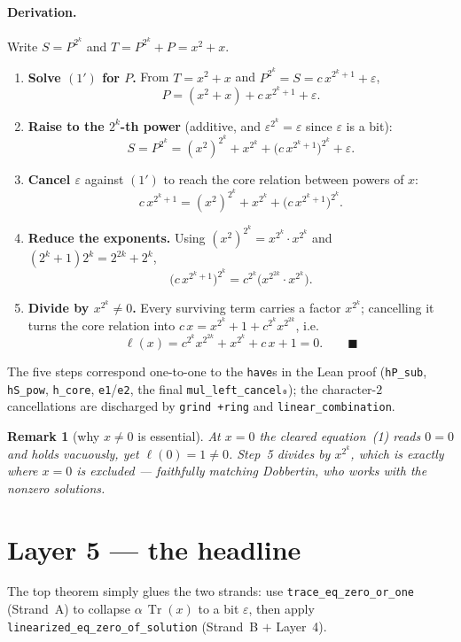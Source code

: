 \documentclass[11pt]{article}
\newcommand{\lc}[1]{\texttt{#1}}
\newcommand{\Tr}{\operatorname{Tr}}
\newtheorem*{remark}{Remark}
\begin{document}
\paragraph{Derivation.}  Write $S=P^{2^k}$ and $T=P^{2^k}+P=x^2+x$.

\begin{enumerate}\itemsep2pt
\item \textbf{Solve $(1')$ for $P$.}  From $T=x^2+x$ and
      $P^{2^k}=S=c\,x^{2^k+1}+\varepsilon$,
      \[ P=(x^2+x)+c\,x^{2^k+1}+\varepsilon. \]
\item \textbf{Raise to the $2^k$-th power} (additive, and
      $\varepsilon^{2^k}=\varepsilon$ since $\varepsilon$ is a bit):
      \[ S=P^{2^k}=(x^2)^{2^k}+x^{2^k}+\bigl(c\,x^{2^k+1}\bigr)^{2^k}+\varepsilon. \]
\item \textbf{Cancel $\varepsilon$} against $(1')$ to reach the core relation
      between powers of $x$:
      \[ c\,x^{2^k+1}=(x^2)^{2^k}+x^{2^k}+\bigl(c\,x^{2^k+1}\bigr)^{2^k}. \]
\item \textbf{Reduce the exponents.}  Using $(x^2)^{2^k}=x^{2^k}\!\cdot x^{2^k}$
      and $(2^k+1)2^k=2^{2k}+2^k$,
      \[ \bigl(c\,x^{2^k+1}\bigr)^{2^k}=c^{2^k}\bigl(x^{2^{2k}}\!\cdot x^{2^k}\bigr). \]
\item \textbf{Divide by $x^{2^k}\neq0$.}  Every surviving term carries a factor
      $x^{2^k}$; cancelling it turns the core relation into
      $c\,x=x^{2^k}+1+c^{2^k}x^{2^{2k}}$, i.e.
      \[ \ell(x)=c^{2^k}x^{2^{2k}}+x^{2^k}+c\,x+1=0. \qquad\blacksquare \]
\end{enumerate}

\noindent The five steps correspond one-to-one to the \lc{have}s in the Lean
proof (\lc{hP\_sub}, \lc{hS\_pow}, \lc{h\_core}, \lc{e1}/\lc{e2}, the final
\lc{mul\_left\_cancel₀}); the character-$2$ cancellations are discharged by
\lc{grind +ring} and \lc{linear\_combination}.

\begin{remark}[why $x\neq0$ is essential]
At $x=0$ the cleared equation~(1) reads $0=0$ and holds \emph{vacuously}, yet
$\ell(0)=1\neq0$.  Step~5 divides by $x^{2^k}$, which is exactly where $x=0$ is
excluded --- faithfully matching Dobbertin, who works with the nonzero solutions.
\end{remark}

\section{Layer 5 --- the headline}
The top theorem simply glues the two strands: use \lc{trace\_eq\_zero\_or\_one}
(Strand~A) to collapse $\alpha\,\Tr(x)$ to a bit $\varepsilon$, then apply
\lc{linearized\_eq\_zero\_of\_solution} (Strand~B $+$ Layer~4).
\end{document}
